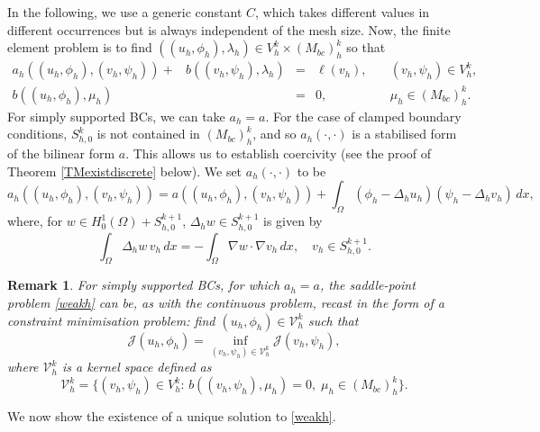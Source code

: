 \documentclass[a4paper,final]{siamltex}
\newtheorem{remark}[theorem]{Remark}
\newcommand{\CV}{\mathcal{V}}
\newcommand{\CJ}{\mathcal{J}}
\newcommand{\Mb}{{(M_{bc})}}
\begin{document}
In the following, we use a generic constant $C$, which takes 
different values in different occurrences but is always independent of the 
mesh size. 
Now, the finite element problem is to find 
$((u_h,\phi_h),\lambda_h) \in V^k_h \times \Mb^k_h$ so that 
\begin{equation}\label{weakh}
\begin{array}{llccc}
a_h((u_h,\phi_h),(v_h,\psi_h))+&b((v_h,\psi_h),\lambda_h)&=&\ell(v_h),&\quad (v_h,\psi_h) \in  V^k_h, \\
b((u_h,\phi_h),\mu_h)&&=&0,&\quad \mu_h\in \Mb^k_h.
\end{array}
\end{equation}
For simply supported BCs, we can take $a_h=a$.
For the case of clamped boundary conditions, $S^k_{h,0}$ is not contained in
$\Mb^k_h$, and so $a_h(\cdot,\cdot)$ is a stabilised form of the bilinear form $a$.
This allows us to establish coercivity (see the proof of Theorem \ref{TMexistdiscrete} below).
We set $a_h(\cdot,\cdot)$ to be 
\begin{equation}
	\label{EQstabilised}
	a_h((u_h,\phi_h),(v_h,\psi_h)) = a((u_h,\phi_h),(v_h,\psi_h)) + 
					 \int_{\Omega} (\phi_h - \Delta_h u_h) (\psi_h - \Delta_h v_h)\,dx,
\end{equation}
where, for $w\in H^1_0(\Omega)+S^{k+1}_{h,0}$, $\Delta_h w \in S^{k+1}_{h,0}$ is given by
\begin{equation}\label{def.Deltah}
	\int_{\Omega} \Delta_h w\, v_h \,dx = -\int_{\Omega} \nabla w\cdot \nabla v_h \,dx, \quad 
v_h \in S_{h,0}^{k+1}.
\end{equation}

\begin{remark} 
For simply supported BCs, for which $a_h=a$, the saddle-point problem \eqref{weakh} can be, as with the continuous
problem, recast in the form of a constraint minimisation problem: find  $(u_h,\phi_h) \in \CV^k_h$ such that
\begin{equation}\label{cmbiharmh}
\CJ(u_h,\phi_h)=\inf_{(v_h,\psi_h) \in \CV^k_h}\CJ(v_h,\psi_h),
\end{equation}
where $ \CV^k_h $ is a kernel space defined as 
\begin{equation}\label{def:CV}
 \CV^k_h =\{ (v_h, \psi_h) \in V^k_h :\, b((v_h,\psi_h),\mu_h) = 0,\; \mu_h \in \Mb^k_h\}.
\end{equation}
\end{remark}

We now show the existence of a unique solution to \eqref{weakh}.
\end{document}
